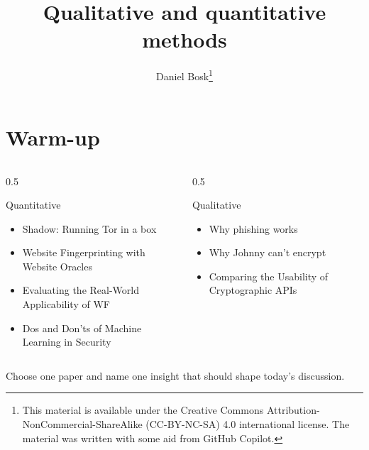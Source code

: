 \title{%
  Qualitative and quantitative methods
}
\author{Daniel Bosk\thanks{%
    This material is available under the Creative Commons 
    Attribution-NonCommercial-ShareAlike (CC-BY-NC-SA) 4.0 international 
    license.
    The material was written with some aid from GitHub Copilot.
}}

\begin{frame}
  \maketitle
\end{frame}

\mode*

\begin{abstract}
  
\end{abstract}

\clearpage

\section{Warm-up}

\begin{frame}
\begin{columns}[T,totalwidth=\linewidth]
  \begin{column}{0.5\linewidth}
    \begin{block}{Quantitative}
      \begin{itemize}
        \setlength{\itemsep}{0pt}
        \item Shadow: Running Tor in a box
        \item Website Fingerprinting with Website Oracles
        \item Evaluating the Real-World Applicability of WF
        \item Dos and Don'ts of Machine Learning in Security
      \end{itemize}
    \end{block}
  \end{column}
  \begin{column}{0.5\linewidth}
    \begin{block}{Qualitative}
      \begin{itemize}
        \setlength{\itemsep}{0pt}
        \item Why phishing works
        \item Why Johnny can't encrypt
        \item Comparing the Usability of Cryptographic APIs
      \end{itemize}
    \end{block}
  \end{column}
\end{columns}
  \begin{exercise}[Warm-up]
    Choose one paper and name one insight that should shape today's
    discussion.
  \end{exercise}
\end{frame}

